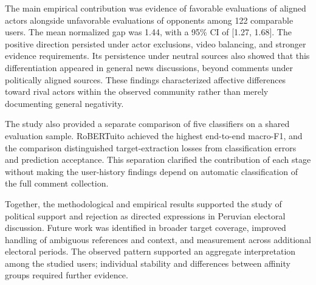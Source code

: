 \documentclass[conference, letterpaper]{IEEEtran}
\begin{document}
The main empirical contribution was evidence of favorable evaluations of aligned actors alongside unfavorable evaluations of opponents among 122 comparable users. The mean normalized gap was 1.44, with a 95\% CI of [1.27, 1.68]. The positive direction persisted under actor exclusions, video balancing, and stronger evidence requirements. Its persistence under neutral sources also showed that this differentiation appeared in general news discussions, beyond comments under politically aligned sources. These findings characterized affective differences toward rival actors within the observed community rather than merely documenting general negativity.

The study also provided a separate comparison of five classifiers on a shared evaluation sample. RoBERTuito achieved the highest end-to-end macro-F1, and the comparison distinguished target-extraction losses from classification errors and prediction acceptance. This separation clarified the contribution of each stage without making the user-history findings depend on automatic classification of the full comment collection.

Together, the methodological and empirical results supported the study of political support and rejection as directed expressions in Peruvian electoral discussion. Future work was identified in broader target coverage, improved handling of ambiguous references and context, and measurement across additional electoral periods. The observed pattern supported an aggregate interpretation among the studied users; individual stability and differences between affinity groups required further evidence.






\end{document}
